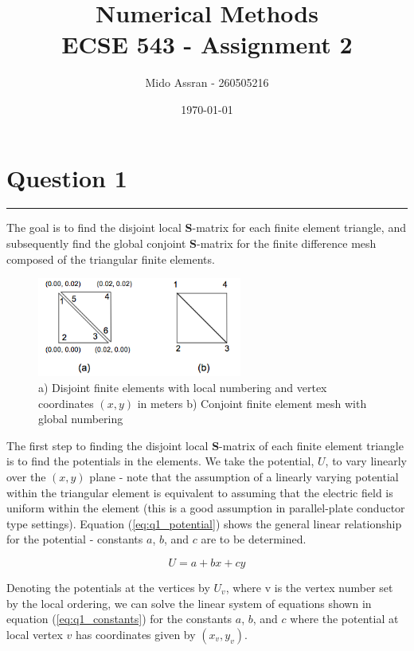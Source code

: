 \documentclass[11pt]{amsart}
\title{Numerical Methods\\[0.1in]
	ECSE 543 - Assignment 2}
\author{Mido Assran - 260505216}
\date{\today}
\begin{document}
\maketitle

\section*{Question 1}
\vspace*{-0.2in}
\noindent\rule{\textwidth}{0.4pt}

The goal is to find the disjoint local \textbf{S}-matrix for each finite element triangle, and subsequently find the global conjoint \textbf{S}-matrix for the finite difference mesh composed of the triangular finite elements.

\begin{figure}[h]
    \includegraphics[width=0.6\textwidth]{assets/question_1.png}
    \caption{a) Disjoint finite elements with local numbering and vertex coordinates $(x,y)$ in meters b) Conjoint finite element mesh with global numbering}
    \label{fig:q1_mesh}
\end{figure}

The first step to finding the disjoint local \textbf{S}-matrix of each finite element triangle is to find the potentials in the elements. We take the potential, $U$, to vary linearly over the $(x,y)$ plane - note that the assumption of a linearly varying potential within the triangular element is equivalent to assuming that the electric field is uniform within the element (this is a good assumption in parallel-plate conductor type settings). Equation (\ref{eq:q1_potential}) shows the general linear relationship for the potential - constants $a$, $b$, and $c$ are to be determined.

\begin{equation}
	\label{eq:q1_potential}
	U = a + bx + cy
\end{equation}

Denoting the potentials at the vertices by $U_v$, where v is the vertex number set by the local ordering, we can solve the linear system of equations shown in equation (\ref{eq:q1_constants}) for the constants $a$, $b$, and $c$ where the potential at local vertex $v$ has coordinates given by $(x_v,y_v)$.
\end{document}
